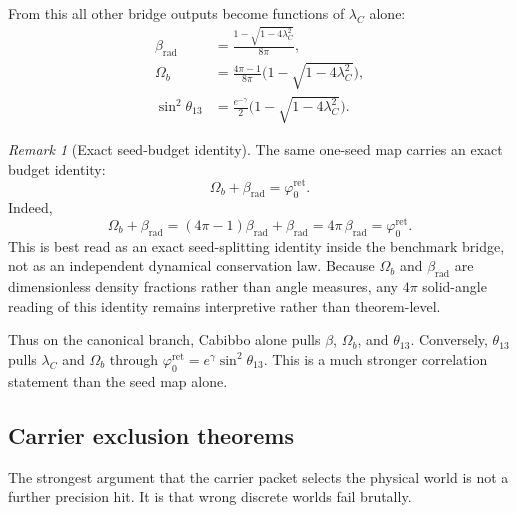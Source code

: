 \documentclass[11pt,a4paper]{article}
\theoremstyle{definition}
\theoremstyle{remark}
\newtheorem*{remark}{Remark}
\newcommand{\phiz}{\varphi_0^{\mathrm{ret}}}
\begin{document}
From this all other bridge outputs become functions of $\lambda_C$ alone:
\begin{equation}
\label{eq:lambda-c-master}
\begin{aligned}
\beta_{\mathrm{rad}}&=\frac{1-\sqrt{1-4\lambda_C^2}}{8\pi},\\
\Omega_b&=\frac{4\pi-1}{8\pi}\bigl(1-\sqrt{1-4\lambda_C^2}\bigr),\\
\sin^2\theta_{13}&=\frac{e^{-\gamma}}{2}\bigl(1-\sqrt{1-4\lambda_C^2}\bigr).
\end{aligned}
\end{equation}
\begin{remark}[Exact seed-budget identity]
The same one-seed map carries an exact budget identity:
\begin{equation}
\label{eq:seed-budget-identity}
\Omega_b+\beta_{\mathrm{rad}}=\phiz.
\end{equation}
Indeed,
\[
\Omega_b+\beta_{\mathrm{rad}}
=(4\pi-1)\beta_{\mathrm{rad}}+\beta_{\mathrm{rad}}
=4\pi\,\beta_{\mathrm{rad}}
=\phiz.
\]
This is best read as an exact seed-splitting identity inside the benchmark bridge, not as an independent dynamical conservation law.
Because $\Omega_b$ and $\beta_{\mathrm{rad}}$ are dimensionless density fractions rather than angle measures, any $4\pi$ solid-angle reading of this identity remains interpretive rather than theorem-level.
\end{remark}

Thus on the canonical branch, Cabibbo alone pulls $\beta$, $\Omega_b$, and $\theta_{13}$. Conversely, $\theta_{13}$ pulls $\lambda_C$ and $\Omega_b$ through $\phiz=e^\gamma\sin^2\theta_{13}$. This is a much stronger correlation statement than the seed map alone.

\subsection{Carrier exclusion theorems}

The strongest argument that the carrier packet selects the physical world is not a further precision hit. It is that wrong discrete worlds fail brutally.
\end{document}
